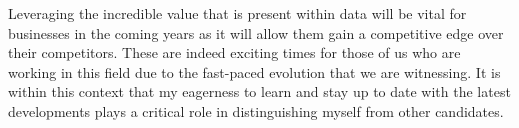 \documentclass[11pt, a4paper]{awesome-cv}
\begin{document}
\begin{cvletter}
Leveraging the incredible value that is present within data will be vital for businesses in the coming years as it will allow them gain a competitive edge over their competitors. These are indeed exciting times for those of us who are working in this field due to the fast-paced evolution that we are witnessing. It is within this context that my eagerness to learn and stay up to date with the latest developments plays a critical role in distinguishing myself from other candidates. 

\end{cvletter}

\makeletterclosing
\end{document}
